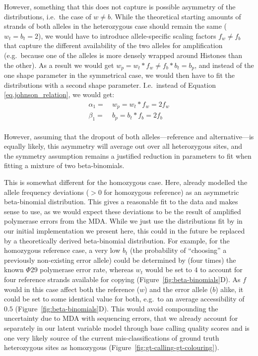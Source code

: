 \documentclass[authoryear,preprint,11pt]{scrartcl}
\begin{document}
However, something that this does not capture is possible asymmetry of the distributions, i.e.~the case of $w \neq b$.
While the theoretical starting amounts of strands of both alleles in the heterozygous case should remain the same ($w_t = b_t = 2$), we would have to introduce allele-specific scaling factors $f_w \neq f_b$ that capture the different availability of the two alleles for amplification (e.g.~because one of the alleles is more densely wrapped around Histones than the other).
As a result we would get $w_p = w_t * f_w \neq f_b * b_t = b_p$, and instead of the one shape parameter in the symmetrical case, we would then have to fit the distributions with a second shape parameter.
I.e.~instead of Equation \ref{eq.johnson_relation}, we would get:
\begin{equation}
 \label{eq.assym_het_beta-binom}
 \begin{split}
  \alpha_1 =~ & w_p = w_t * f_w = 2 f_w\\
  \beta_1 =~ & b_p = b_t * f_b = 2 f_b
 \end{split}
\end{equation}\\

However, assuming that the dropout of both alleles---reference and alternative---is equally likely, this asymmetry will average out over all heterozygous sites, and the symmetry assumption remains a justified reduction in parameters to fit when fitting a mixture of two beta-binomials.

This is somewhat different for the homozygous case.
Here, \cite{lodato_somatic_2015} already modelled the allele frequency deviations ($>0$ for homozygous reference) as an asymmetric beta-binomial distribution.
This gives a reasonable fit to the data and makes sense to use, as we would expect these deviations to be the result of amplified polymerase errors from the MDA.
While we just use the distributions fit by \cite{lodato_somatic_2015} in our initial implementation we present here, this could in the future be replaced by a theoretically derived beta-binomial distribution.
For example, for the homozygous reference case, a very low $b_t$ (the probability of ``choosing'' a previously non-existing error allele) could be determined by (four times) the known $\Phi$29 polymerase error rate, whereas $w_t$ would be set to $4$ to account for four reference strands available for copying (Figure~\ref{fig:beta-binomials}D).
As $f$ would in this case affect both the reference ($w$) and the error allele ($b$) alike, it could be set to some identical value for both, e.g.~to an average accessibility of $0.5$ (Figure~\ref{fig:beta-binomials}D).
This would avoid compounding the uncertainty due to MDA with sequencing errors, that we already account for separately in our latent variable model through base calling quality scores and is one very likely source of the current mis-classifications of ground truth heterozygous sites as homozygous (Figure~\ref{fig:gt-calling-gt-colouring}).\\
\end{document}
